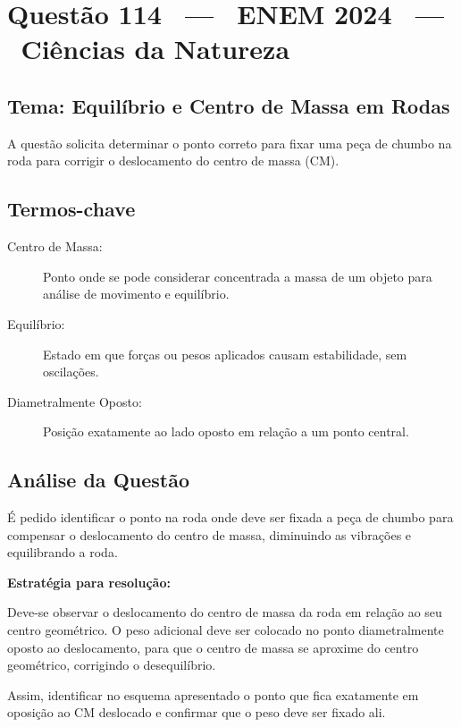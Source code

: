 \documentclass{article}
\begin{document}
\section*{Questão 114 \, --- \, ENEM 2024 \, --- \, Ciências da Natureza}

\subsection*{Tema: Equilíbrio e Centro de Massa em Rodas}

A questão solicita determinar o ponto correto para fixar uma peça de chumbo na roda para corrigir o deslocamento do centro de massa (CM).

\subsection*{Termos-chave}
\begin{description}
  \item[Centro de Massa:] Ponto onde se pode considerar concentrada a massa de um objeto para análise de movimento e equilíbrio.
  \item[Equilíbrio:] Estado em que forças ou pesos aplicados causam estabilidade, sem oscilações.
  \item[Diametralmente Oposto:] Posição exatamente ao lado oposto em relação a um ponto central.
\end{description}

\subsection*{Análise da Questão}
É pedido identificar o ponto na roda onde deve ser fixada a peça de chumbo para compensar o deslocamento do centro de massa, diminuindo as vibrações e equilibrando a roda.

\textbf{Estratégia para resolução:}

Deve-se observar o deslocamento do centro de massa da roda em relação ao seu centro geométrico. O peso adicional deve ser colocado no ponto diametralmente oposto ao deslocamento, para que o centro de massa se aproxime do centro geométrico, corrigindo o desequilíbrio.

Assim, identificar no esquema apresentado o ponto que fica exatamente em oposição ao CM deslocado e confirmar que o peso deve ser fixado ali.
\end{document}
